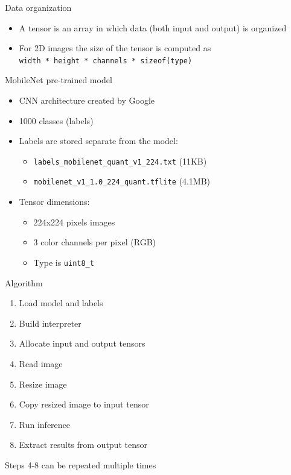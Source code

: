 \begin{frame}{Data organization}
  \begin{itemize}
	\item A tensor is an array in which data (both input and output) is organized
	\item For 2D images the size of the tensor is computed as \\ \texttt{width * height *
	channels * sizeof(type)}
  \end{itemize}
\end{frame}

\begin{frame}{MobileNet pre-trained model}
  \begin{itemize}
	\item CNN architecture created by Google
	\item 1000 classes (labels)
	\item Labels are stored separate from the model:
	  \begin{itemize}
		\item \texttt{labels\_mobilenet\_quant\_v1\_224.txt} (11KB)
		\item \texttt{mobilenet\_v1\_1.0\_224\_quant.tflite} (4.1MB)
	  \end{itemize}
	\item Tensor dimensions:
	  \begin{itemize}
		\item 224x224 pixels images
		\item 3 color channels per pixel (RGB)
		\item Type is \texttt{uint8\_t}
	  \end{itemize}
  \end{itemize}
\end{frame}

\begin{frame}{Algorithm}
  \begin{enumerate}
	\item Load model and labels
	\item Build interpreter
	\item Allocate input and output tensors
	\item Read image
	\item Resize image
	\item Copy resized image to input tensor
	\item Run inference
	\item Extract results from output tensor
  \end{enumerate}
\bigskip
Steps 4-8 can be repeated multiple times
\end{frame}

